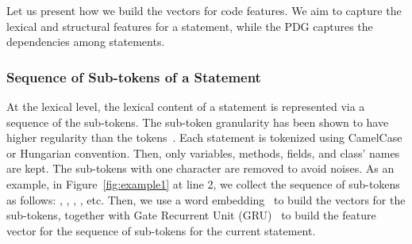 Let us present how we build the vectors for code
features. We aim to capture the lexical and structural features for a
statement, while the PDG captures the dependencies among statements.











\vspace{-1pt}
\subsubsection{Sequence of Sub-tokens of a Statement}

At the lexical level, the lexical content of a statement is
represented via a sequence of the sub-tokens. The sub-token
granularity has been shown to have higher regularity than the
tokens~\cite{icse20-methodname}. Each statement is tokenized using
CamelCase or Hungarian convention. Then, only variables, methods,
fields, and class' names are kept. The sub-tokens with one character
are removed to avoid noises. As an example, in
Figure~\ref{fig:example1} at line 2, we collect the sequence of
sub-tokens as follows: , , ,
, etc. Then, we use a word embedding~\cite{glove2014} to
build the vectors for the sub-tokens, together with Gate Recurrent
Unit (GRU)~\cite{chung2014empirical} to build the feature vector for
the sequence of sub-tokens for the current statement.



